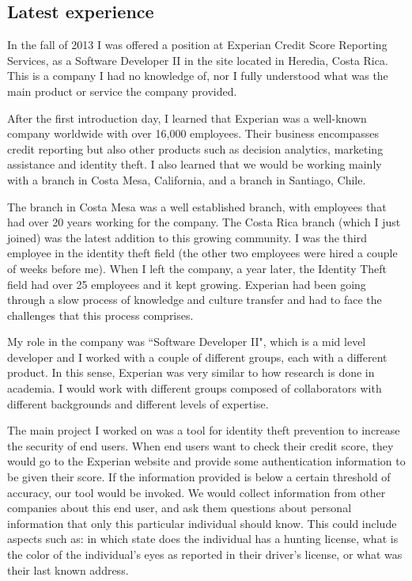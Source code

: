 \documentclass[12pt, letterpaper]{article}
\begin{document}
\subsection{Latest experience}
In the fall of 2013 I was offered a position at Experian Credit Score Reporting Services, as a Software Developer II in the site located in Heredia, Costa Rica.
This is a company I had no knowledge of, nor I fully understood what was the main product or service
the company provided. 

After the first introduction day, I learned that Experian was a well-known company worldwide with over 16,000
employees. Their business encompasses credit reporting but also other products such as decision 
analytics, marketing assistance and identity theft. I also learned that we would be working mainly with a branch in 
Costa Mesa, California, and a branch in Santiago, Chile. 

The branch in Costa Mesa was a well established branch, with 
employees that had over 20 years working for the company. The Costa Rica branch (which I just joined) was the 
latest addition to this growing 
community. I was the third employee in the identity theft field (the other two employees were hired a couple of 
weeks before me). When I left the company, a year later, the Identity Theft field had over 25 employees and it 
kept growing. Experian had been going through a slow process of knowledge and culture transfer and had to face
the challenges that this process comprises.

My role in the company was ``Software Developer II", which is a mid level developer and I worked with a couple
of different groups, each with a different product. In this sense, Experian was very similar to how research is done in academia. I would
work with different groups composed of collaborators with different backgrounds and different levels
of expertise.

The main project I worked on was a tool for identity theft prevention to increase the security of end users.
When end users want to check their credit score, they would go to the Experian website and provide some authentication
information to be given their score. If the information provided is below a certain threshold of accuracy, our tool would be invoked. We would collect 
information from other companies about this end user, and ask them questions about personal information that only this particular
individual should know. This could include aspects such as: in which state does the individual has a hunting license, 
what is the color of the individual's eyes as reported in their driver's license, or what was their last known address.
 
\end{document}
